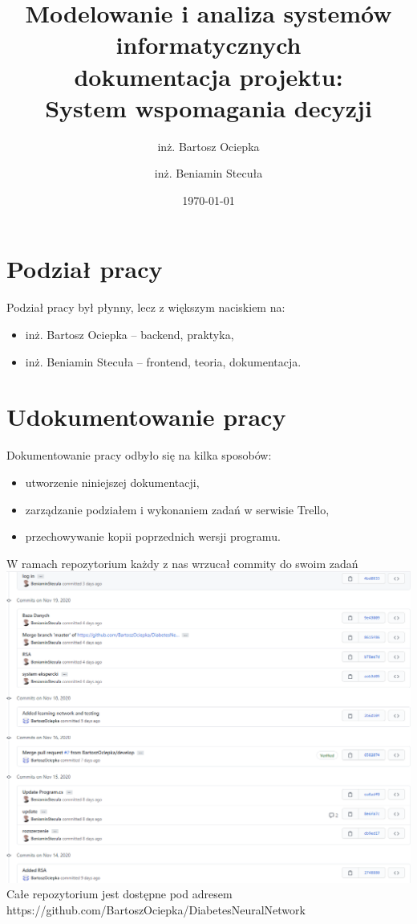 \documentclass[12pt,a4paper]{article}
\begin{document}
	
	\title{Modelowanie i analiza systemów informatycznych\\
			\bigskip
			\large{dokumentacja projektu:} \\
			\large{System wspomagania decyzji}
		}
	\author{inż. Bartosz Ociepka
		\and inż. Beniamin Stecuła}
	\date{\today}
	
	\maketitle







	\newpage
\section*{Podział pracy}
Podział pracy był płynny, lecz z większym naciskiem na:
\begin{itemize}
	\item inż. Bartosz Ociepka -- backend, praktyka,
	\item inż. Beniamin Stecuła -- frontend, teoria, dokumentacja.
\end{itemize}
	
	
	
\section*{Udokumentowanie pracy}
	Dokumentowanie pracy odbyło się na kilka sposobów:
	\begin{itemize}
		\item utworzenie niniejszej dokumentacji,
		\item zarządzanie podziałem i wykonaniem zadań w serwisie Trello,
		\item przechowywanie kopii poprzednich wersji programu.
	\end{itemize}
	
	W ramach repozytorium każdy z nas wrzucał commity do swoim zadań \\
	\includegraphics[width=0.9\linewidth]{media/githubProof}\\
	Całe repozytorium jest dostępne pod adresem \\https://github.com/BartoszOciepka/DiabetesNeuralNetwork
	
\end{document}
